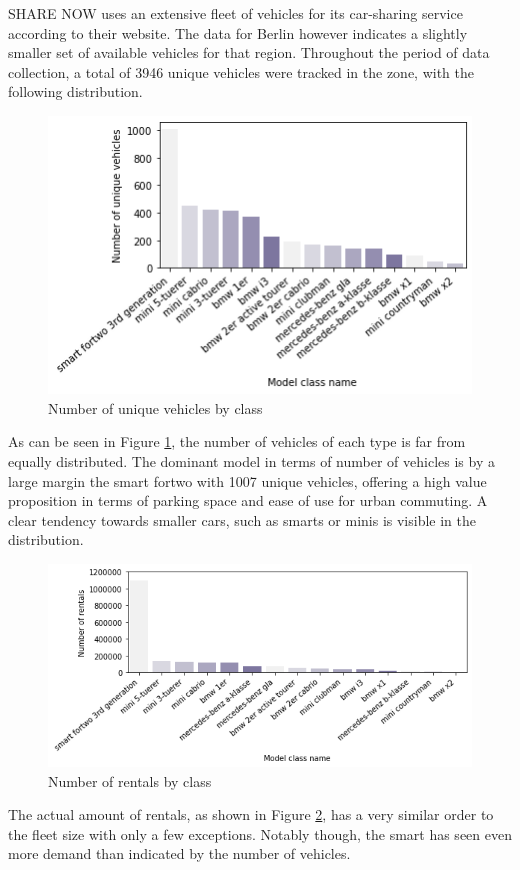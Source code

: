 SHARE NOW uses an extensive fleet of vehicles for its car-sharing service according to their website. The data
for Berlin however indicates a slightly smaller set of available vehicles for that region. Throughout the
period of data collection, a total of 3946 unique vehicles were tracked in the zone, with the following
distribution.

\begin{figure}[htbp]
  \centering
  \includegraphics[width=.6\linewidth]{./Figures/fleet.png}
  \caption{Number of unique vehicles by class}
  \label{fig:Fleet}
\end{figure}

As can be seen in Figure \ref{fig:Fleet}, the number of vehicles of each type is far from equally distributed.
The dominant model in terms of number of vehicles is by a large margin the smart fortwo with 1007 unique vehicles, 
offering a high value proposition
in terms of parking space and ease of use for urban commuting. A clear tendency towards smaller cars, such as smarts
or minis is visible in the distribution.

\begin{figure}[htbp]
  \centering
  \includegraphics[width=.7\linewidth]{./Figures/travels.png}
  \caption{Number of rentals by class}
  \label{fig:Rentals}
\end{figure}

The actual amount of rentals, as shown in Figure \ref{fig:Rentals}, has a very similar order to the fleet size 
with only a few exceptions. Notably though, the smart has
seen even more demand than indicated by the number of vehicles.

